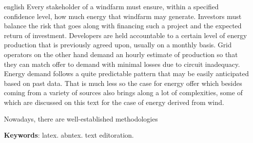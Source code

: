 \documentclass[
	12pt,				%
	openright,			%
	oneside,			%
	a4paper,			%
	english,			%
	french,				%
	spanish,			%
	brazil				%
	]{abntex2}
\begin{document}
\begin{resumo}[Abstract]
 \begin{otherlanguage*}{english}
	Every stakeholder of a windfarm must ensure, within a specified confidence level, how much energy that windfarm may generate. Investors must balance the risk that goes along with financing such a project and the expected return of investment. Developers are held accountable to a certain level of energy production that is previously agreed upon, usually on a monthly basis. Grid operators on the other hand demand an hourly estimate of production so that they can match offer to demand with minimal losses due to circuit inadequacy. Energy demand follows a quite predictable pattern that may be easily anticipated based on past data. That is much less so the case for energy offer which besides coming from a variety of sources also brings along a lot of complexities, some of which are discussed on this text for the case of energy derived from wind.
	
	Nowadays, there are well-established methodologies

 
   \textbf{Keywords}: latex. abntex. text editoration.
 \end{otherlanguage*}
\end{resumo}

 

  

\listoffigures*

\end{document}
